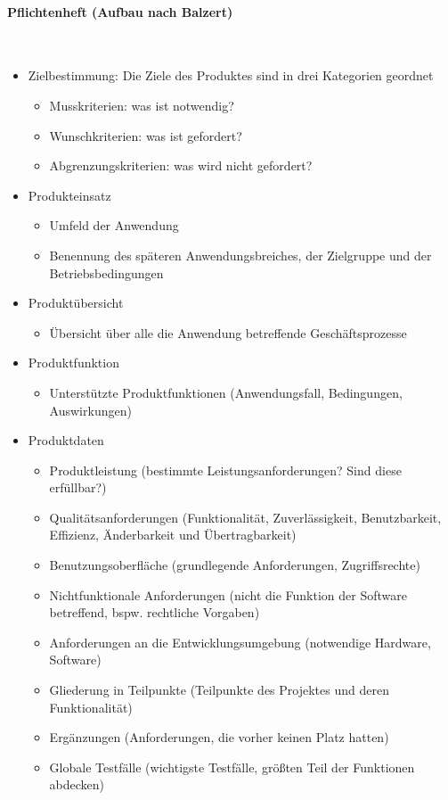 \paragraph{Pflichtenheft (Aufbau nach Balzert)}~\\
\begin{itemize}
	\item Zielbestimmung: Die Ziele des Produktes sind in drei Kategorien geordnet
	\begin{itemize}
		\item Musskriterien: was ist notwendig?
		\item Wunschkriterien: was ist gefordert?
		\item Abgrenzungskriterien: was wird nicht gefordert?
	\end{itemize}
	\item Produkteinsatz
	\begin{itemize}
		\item Umfeld der Anwendung
		\item Benennung des späteren Anwendungsbreiches, der Zielgruppe und der Betriebsbedingungen
	\end{itemize}
	\item Produktübersicht
	\begin{itemize}
		\item Übersicht über alle die Anwendung betreffende Geschäftsprozesse
	\end{itemize}
	\item Produktfunktion
	\begin{itemize}
		\item Unterstützte Produktfunktionen (Anwendungsfall, Bedingungen, Auswirkungen)
	\end{itemize}
	\item Produktdaten
	\begin{itemize}
		\item Produktleistung (bestimmte Leistungsanforderungen? Sind diese erfüllbar?)
		\item Qualitätsanforderungen (Funktionalität, Zuverlässigkeit, Benutzbarkeit, Effizienz, Änderbarkeit und Übertragbarkeit)
		\item Benutzungsoberfläche (grundlegende Anforderungen, Zugriffsrechte)
		\item Nichtfunktionale Anforderungen (nicht die Funktion der Software betreffend, bspw. rechtliche Vorgaben)
		\item Anforderungen an die Entwicklungsumgebung (notwendige Hardware, Software)
		\item Gliederung in Teilpunkte (Teilpunkte des Projektes und deren Funktionalität)
		\item Ergänzungen (Anforderungen, die vorher keinen Platz hatten)
		\item Globale Testfälle (wichtigste Testfälle, größten Teil der Funktionen abdecken)
	\end{itemize}
\end{itemize}

